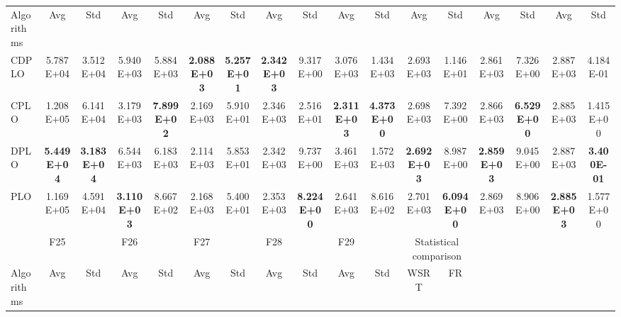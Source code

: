 \documentclass[review]{elsarticle}
\begin{document}
\begin{table}
\begin{tabular}{@{}lcccccccccccccccc@{}}
Algorithms & Avg                & Std                & Avg                & Std                & Avg                & Std                & Avg                & Std                & Avg                & Std                & Avg                  & Std                 & Avg                & Std                & Avg                & Std                \\
CDPLO      & 5.787E+04          & 3.512E+04          & 5.940E+03          & 5.884E+03          & \textbf{2.088E+03} & \textbf{5.257E+01} & \textbf{2.342E+03} & 9.317E+00          & 3.076E+03          & 1.434E+03          & 2.693E+03            & 1.146E+01           & 2.861E+03          & 7.326E+00          & 2.887E+03          & 4.184E-01          \\
CPLO       & 1.208E+05          & 6.141E+04          & 3.179E+03          & \textbf{7.899E+02} & 2.169E+03          & 5.910E+01          & 2.346E+03          & 2.516E+01          & \textbf{2.311E+03} & \textbf{4.373E+00} & 2.698E+03            & 7.392E+00           & 2.866E+03          & \textbf{6.529E+00} & 2.885E+03          & 1.415E+00          \\
DPLO       & \textbf{5.449E+04} & \textbf{3.183E+04} & 6.544E+03          & 6.183E+03          & 2.114E+03          & 5.853E+01          & 2.342E+03          & 9.737E+00          & 3.461E+03          & 1.572E+03          & \textbf{2.692E+03}   & 8.987E+00           & \textbf{2.859E+03} & 9.045E+00          & 2.887E+03          & \textbf{3.400E-01} \\
PLO        & 1.169E+05          & 4.591E+04          & \textbf{3.110E+03} & 8.667E+02          & 2.168E+03          & 5.400E+01          & 2.353E+03          & \textbf{8.224E+00} & 2.641E+03          & 8.616E+02          & 2.701E+03            & \textbf{6.094E+00}  & 2.869E+03          & 8.906E+00          & \textbf{2.885E+03} & 1.577E+00          \\
           & F25                &                    & F26                &                    & F27                &                    & F28                &                    & F29                &                    & \multicolumn{2}{c}{Statistical comparison} &                    &                    &                    &                    \\
Algorithms & Avg                & Std                & Avg                & Std                & Avg                & Std                & Avg                & Std                & Avg                & Std                & WSRT                 & FR                  &                    &                    &                    &                    \\

\end{tabular}
\end{table}
\end{document}
